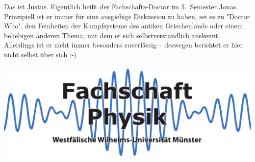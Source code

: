 \begin{multicols*}{2}
{Das ist Justus. Eigentlich heißt der Fachschafts-Doctor im 5.~Semester Jonas.
Prinzipiell ist er immer für eine ausgiebige Diskussion zu haben, sei es zu "Doctor Who", den Feinheiten der Kampfsysteme des antiken Griechenlands oder einem beliebigen anderen Thema, mit dem er sich selbstverständlich auskennt.
Allerdings ist er nicht immer besonders zuverlässig -- deswegen berichtet er hier nicht selbst über sich ;-)}

\begin{center}
	\includegraphics[width=\columnwidth]{res/fsphys_logo.pdf}
\end{center}


\end{multicols*}
